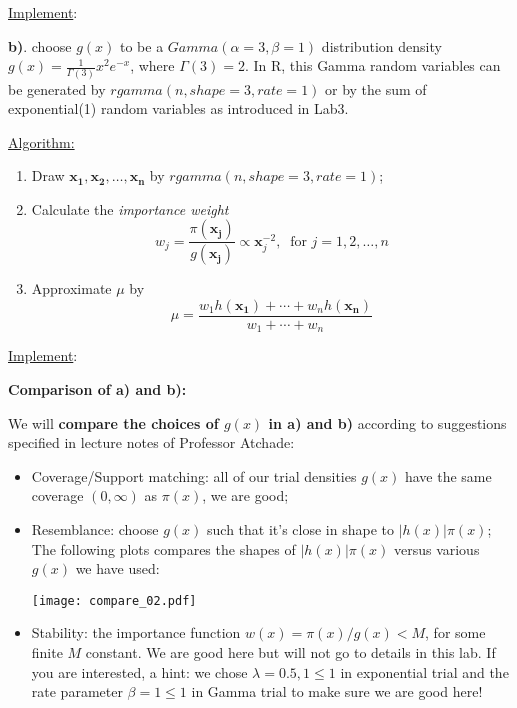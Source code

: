 \documentclass[12pt]{article}
\newcommand{\varx}{\mathbf{x}}
\numberwithin{equation}{subsection}
\begin{document}
\underline{Implement}: 
\newline
\vspace{2.5cm}

\textbf{b)}. choose $g(x)$ to be a $Gamma(\alpha = 3, \beta = 1)$ distribution density $g(x) = \frac{1}{\Gamma(3)}x^2e^{-x}$, where $\Gamma(3) = 2$. In R, this Gamma random variables can be generated by $rgamma(n, shape=3, rate=1)$ or by the sum of exponential(1) random variables as introduced in Lab3.

\underline{Algorithm:}
\begin{enumerate}[(1)]
\item Draw $\mathbf{x_1}, \mathbf{x_2}, \dots, \mathbf{x_n}$ by $rgamma(n, shape=3, rate=1)$;
\item Calculate the \textit{importance weight} $$w_j = \frac{\pi(\mathbf{x_j})}{g(\mathbf{x_j})} \propto \varx_j^{-2},~\text{ for } j = 1, 2, \dots, n$$
\item Approximate $\mu$ by 
$$\hat{\mu} = \frac{w_1h(\mathbf{x_1}) + \cdots + w_nh(\mathbf{x_n})}{w_1 + \cdots + w_n} $$
\end{enumerate}

\underline{Implement}: 
\newline
\vspace{2.5cm}

\textbf{Comparison of a) and b):}\newline

We will \textbf{compare the choices of $g(x)$ in a) and b)} according to suggestions specified in lecture notes of Professor Atchade:
\begin{itemize}
\item Coverage/Support matching: all of our trial densities $g(x)$ have the same coverage $(0, \infty)$ as $\pi(x)$, we are good;
\item Resemblance: choose $g(x)$ such that it's close in shape to $|h(x)|\pi(x)$;\newline
The following plots compares the shapes of $|h(x)|\pi(x)$ versus various $g(x)$ we have used:
\begin{center}
\texttt{[image: compare\_02.pdf]}
\end{center}
\item Stability: the importance function $w(x) = \pi(x) / g(x) < M$, for some finite $M$ constant. We are good here but will not go to details in this lab. If you are interested, a hint: we chose $\lambda = 0.5, 1 \le1$ in exponential trial and the rate parameter $\beta = 1 \le 1$ in Gamma trial to make sure we are good here! 
\end{itemize}
\end{document}

